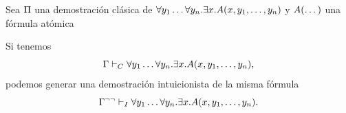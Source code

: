 \begin{theorem}
    \label{fri:thm:fri-pitwo}

    Sea $\Pi$ una demostración clásica de
    \(
    \forall y_1 \dots \forall y_n .
    \exists x .
    A(x, y_1, \dots, y_n)
    \)
    y $A(\dots)$ una fórmula atómica

    Si tenemos
    \[
        \Gamma \vdash_C
        \forall y_1 \dots \forall y_n .
        \exists x .
        A(x, y_1, \dots, y_n),
    \]
    podemos generar una demostración intuicionista de la misma fórmula
    \[
        \Gamma^{\neg\neg} \vdash_I
        \forall y_1 \dots \forall y_n .
        \exists x .
        A(x, y_1, \dots, y_n).
    \]
\end{theorem}

